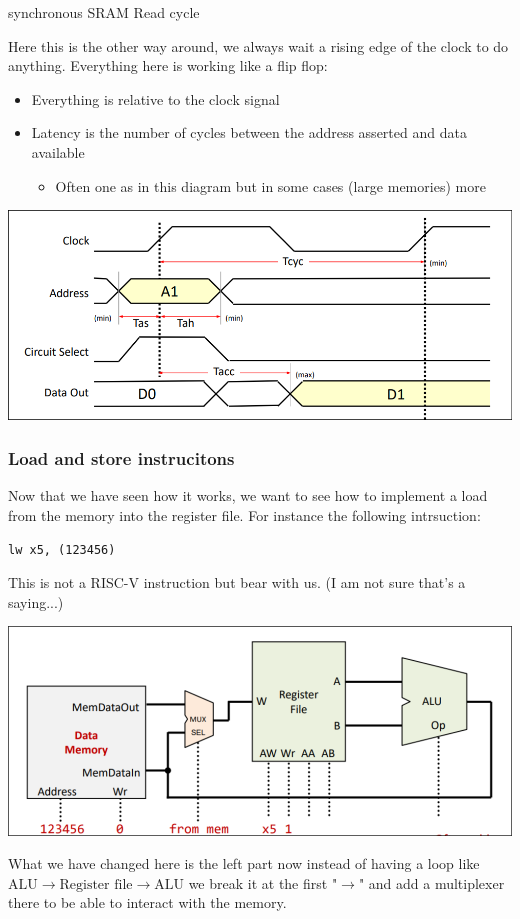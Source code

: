 \begin{parag}{synchronous SRAM Read cycle}
    

Here this is the other way around, we always wait a rising edge of the clock to do anything. Everything here is working like a flip flop:
\begin{itemize}
    \item Everything is relative to the clock signal
    \item Latency is the number of cycles between the address asserted and data available
		\begin{itemize}
			\item Often one as in this diagram but in some cases (large memories) more
		\end{itemize}
\end{itemize}


\begin{center}
\includegraphics[scale=0.25]{screenshots/2025-10-12_7.png}
\end{center}
\end{parag}
\subsubsection{Load and store instrucitons}
Now that we have seen how it works, we want to see how to implement a load from the memory into the register file. For instance the following intrsuction:
\begin{lstlisting}[language={[RISC-V]Assembler}]
lw x5, (123456)
\end{lstlisting}
This is not a RISC-V instruction but bear with us. (I am not sure that's a saying...)


\begin{center}
\includegraphics[scale=0.3]{screenshots/2025-10-12_8.png}
\end{center}
What we have changed here is the left part now instead of having a loop like $\text{ALU} \to \text{Register file} \to \text{ALU}$ we break it at the first "$\to$" and add a multiplexer there to be able to interact with the memory. \\

